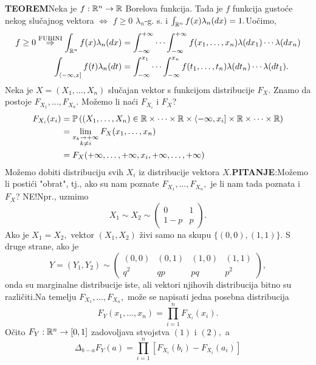 \documentclass{article}
\begin{document}
\textbf{TEOREM}\newline Neka je \(f:\Bbb R^n\to\Bbb R\) Borelova funkcija. Tada je \(f\) funkcija gustoće nekog slučajnog vektora \(\Leftrightarrow\) \(f\ge 0\) \(\lambda_n\)-g. s. i \(\int_{\Bbb R^n}f(x)\lambda_n(dx)=1.\)\newline Uočimo, \[\begin{aligned} f\ge0\overset{\text{FUBINI}}{\Rightarrow}\int_{\Bbb R^n}f(x)\lambda_n(dx)&=\int_{-\infty}^{+\infty}\cdots\int_{-\infty}^{+\infty}f(x_1,\ldots,x_n)\lambda(dx_1)\cdots\lambda(dx_n)\\\int_{\langle -\infty,x]}f(t)\lambda_n(dt)&=\int_{-\infty}^{x_1}\cdots\int_{-\infty}^{x_n}f(t_1,\ldots,t_n)\lambda(dt_n)\cdots\lambda(dt_1).\end{aligned}\] Neka je \(X=(X_1,\ldots,X_n)\) slučajan vektor s funkcijom distribucije \(F_X.\) Znamo da postoje \(F_{X_1},\ldots,F_{X_n}.\) Možemo li naći \(F_{X_i}\) i \(F_X\)? \[\begin{aligned}F_{X_i}(x_i)&=\Bbb P\left((X_1,\ldots,X_n)\in\Bbb R\times\cdots\times\Bbb R\times\langle-\infty,x_i]\times\Bbb R\times\cdots\times\Bbb R\right)\\&=\lim_{\substack{x_k\to+\infty\\k\ne i}}F_X(x_1,\ldots,x_n)\\&=F_X(+\infty,\ldots,+\infty,x_i,+\infty,\ldots,+\infty)\end{aligned}\] Možemo dobiti distribuciju svih \(X_i\) iz distribucije vektora \(X.\)\newline\textbf{PITANJE}:\newline Možemo li postići "obrat", tj., ako su nam poznate \(F_{X_1},\ldots,F_{X_n},\) je li nam tada poznata i \(F_X\)? NE!\newline Npr., uzmimo \[X_1\sim X_2\sim\begin{pmatrix}0&1\\1-p&p\end{pmatrix}.\] Ako je \(X_1=X_2,\) vektor \((X_1, X_2)\) živi samo na skupu \(\{(0,0),(1,1)\}.\) S druge strane, ako je \[Y=(Y_1,Y_2)\sim\begin{pmatrix}(0,0)&(0,1)&(1,0)&(1,1)\\q^2&qp&pq&p^2\end{pmatrix},\] onda su marginalne distribucije iste, ali vektori njihovih distribucija bitno su različiti.\newline Na temelju \(F_{X_1},\ldots,F_{X_n},\) može se napisati jedna posebna distribucija \[F_Y(x_1,\ldots,x_n)=\prod_{i=1}^nF_{X_i}(x_i).\] Očito \(F_Y:\Bbb R^n\to[0,1]\) zadovoljava stvojstva \((1)\) i \((2),\) a \[\Delta_{b-a}F_Y(a)=\prod_{i=1}^n\left[F_{X_i}(b_i)-F_{X_i}(a_i)\right]\]
\end{document}
